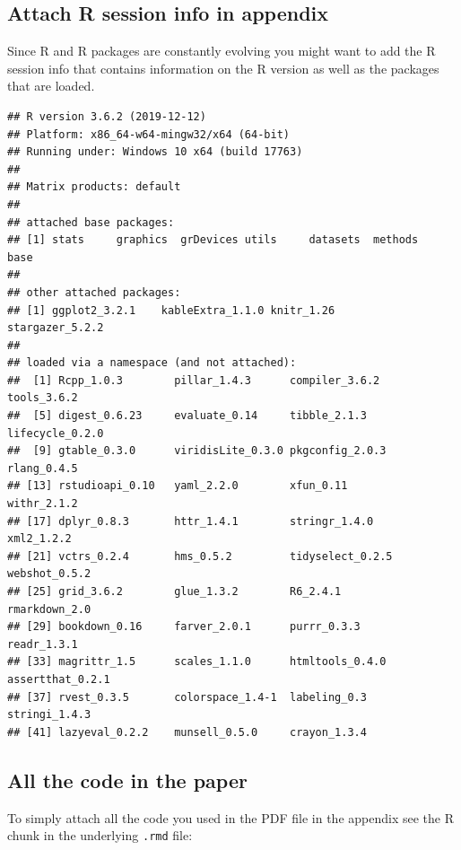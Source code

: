 \documentclass[
  12pt,
]{article}
\begin{document}
\hypertarget{sec:rsessioninfo}{%
\subsection{Attach R session info in appendix}\label{sec:rsessioninfo}}

Since R and R packages are constantly evolving you might want to add the R session info that contains information on the R version as well as the packages that are loaded.

\begin{verbatim}
## R version 3.6.2 (2019-12-12)
## Platform: x86_64-w64-mingw32/x64 (64-bit)
## Running under: Windows 10 x64 (build 17763)
## 
## Matrix products: default
## 
## attached base packages:
## [1] stats     graphics  grDevices utils     datasets  methods   base     
## 
## other attached packages:
## [1] ggplot2_3.2.1    kableExtra_1.1.0 knitr_1.26       stargazer_5.2.2 
## 
## loaded via a namespace (and not attached):
##  [1] Rcpp_1.0.3        pillar_1.4.3      compiler_3.6.2    tools_3.6.2      
##  [5] digest_0.6.23     evaluate_0.14     tibble_2.1.3      lifecycle_0.2.0  
##  [9] gtable_0.3.0      viridisLite_0.3.0 pkgconfig_2.0.3   rlang_0.4.5      
## [13] rstudioapi_0.10   yaml_2.2.0        xfun_0.11         withr_2.1.2      
## [17] dplyr_0.8.3       httr_1.4.1        stringr_1.4.0     xml2_1.2.2       
## [21] vctrs_0.2.4       hms_0.5.2         tidyselect_0.2.5  webshot_0.5.2    
## [25] grid_3.6.2        glue_1.3.2        R6_2.4.1          rmarkdown_2.0    
## [29] bookdown_0.16     farver_2.0.1      purrr_0.3.3       readr_1.3.1      
## [33] magrittr_1.5      scales_1.1.0      htmltools_0.4.0   assertthat_0.2.1 
## [37] rvest_0.3.5       colorspace_1.4-1  labeling_0.3      stringi_1.4.3    
## [41] lazyeval_0.2.2    munsell_0.5.0     crayon_1.3.4
\end{verbatim}

\hypertarget{all-the-code-in-the-paper}{%
\subsection{All the code in the paper}\label{all-the-code-in-the-paper}}

To simply attach all the code you used in the PDF file in the appendix see the R chunk in the underlying \texttt{.rmd} file:
\end{document}
